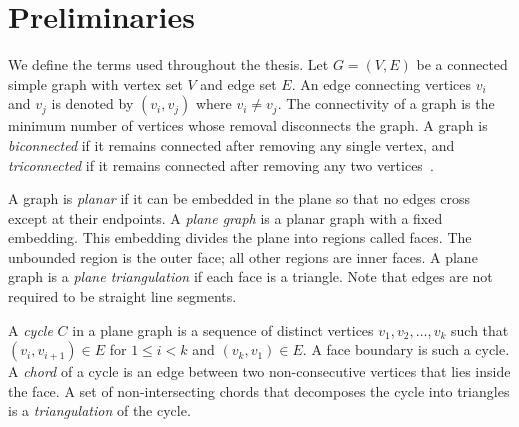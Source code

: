\documentclass[12pt,a4paper]{report}
\theoremstyle{definition}
\theoremstyle{remark}
\newcommand{\Graph}{G}
\begin{document}
\chapter{Preliminaries}
\label{chap:preliminaries}

We define the terms used throughout the thesis. Let $\Graph=(V,E)$ be a connected
simple graph with vertex set $V$ and edge set $E$. An edge connecting vertices $v_i$
and $v_j$ is denoted by $(v_i,v_j)$ where $v_i \neq v_j$. The connectivity of a graph
is the minimum number of vertices whose removal disconnects the graph. A graph is
\textit{biconnected} if it remains connected after removing any single vertex, and
\textit{triconnected} if it remains connected after removing any two
vertices~\cite{diestel2017,hopcroft1974}.

A graph is \textit{planar} if it can be embedded in the plane so that no edges cross
except at their endpoints. A \textit{plane graph} is a planar graph with a fixed
embedding. This embedding divides the plane into regions called faces. The unbounded
region is the outer face; all other regions are inner faces. A plane graph is a
\textit{plane triangulation} if each face is a triangle. Note that edges are not required
to be straight line segments.

A \textit{cycle} $C$ in a plane graph is a sequence of distinct vertices
$v_1,v_2,\ldots,v_k$ such that $(v_i,v_{i+1})\in E$ for $1 \le i < k$ and
$(v_k,v_1)\in E$. A face boundary is such a cycle. A \textit{chord} of a cycle is an
edge between two non-consecutive vertices that lies inside the face. A set of
non-intersecting chords that decomposes the cycle into triangles is a \textit{triangulation}
of the cycle.
\end{document}

